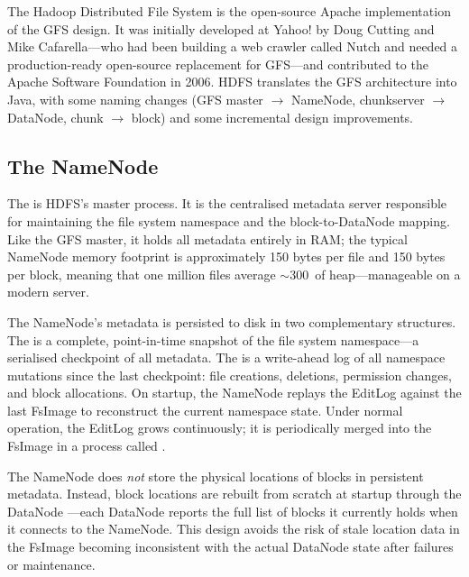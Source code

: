 The Hadoop Distributed File System is the open-source Apache
implementation of the GFS design. It was initially developed at Yahoo!
by Doug Cutting and Mike Cafarella---who had been building a web
crawler called Nutch and needed a production-ready open-source
replacement for GFS---and contributed to the Apache Software Foundation
in 2006. HDFS translates the GFS architecture into Java, with some
naming changes (GFS master $\to$ NameNode, chunkserver $\to$ DataNode,
chunk $\to$ block) and some incremental design improvements.

\subsection{The NameNode}
\label{subsec:namenode}

The  is HDFS's master process. It is the centralised
metadata server responsible for maintaining the file system namespace
and the block-to-DataNode mapping. Like the GFS master, it holds all
metadata entirely in RAM; the typical NameNode memory footprint is
approximately 150 bytes per file and 150 bytes per block, meaning that
one million files average $\sim$300\MB\ of heap---manageable on a
modern server.

The NameNode's metadata is persisted to disk in two complementary
structures. The  is a complete, point-in-time snapshot
of the file system namespace---a serialised checkpoint of all metadata.
The  is a write-ahead log of all namespace mutations
since the last checkpoint: file creations, deletions, permission
changes, and block allocations. On startup, the NameNode replays the
EditLog against the last FsImage to reconstruct the current namespace
state. Under normal operation, the EditLog grows continuously; it is
periodically merged into the FsImage in a process called
.

The NameNode does \emph{not} store the physical locations of blocks in
persistent metadata. Instead, block locations are rebuilt from scratch
at startup through the DataNode ---each DataNode
reports the full list of blocks it currently holds when it connects to
the NameNode. This design avoids the risk of stale location data in
the FsImage becoming inconsistent with the actual DataNode state after
failures or maintenance.


